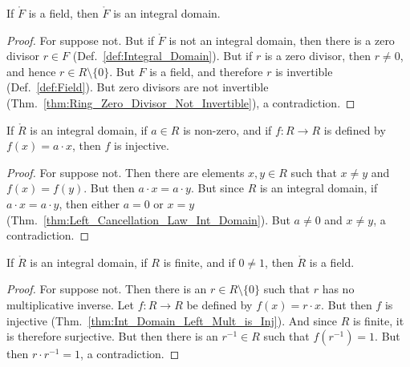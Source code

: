 \documentclass{article}                                                        %
\begin{document}
        \begin{theorem}
            \label{thm:Fields_are_Int_Domains}%
            If $\ring{F}$ is a field, then $\ring{F}$ is an integral domain.
        \end{theorem}
        \begin{proof}
            For suppose not. But if $\ring{F}$ is not an integral domain,
            then there is a zero divisor $r\in{F}$
            (Def.~\ref{def:Integral_Domain}). But if $r$ is a zero divisor, then
            $r\ne{0}$, and hence $r\in{R}\setminus\{0\}$. But $F$ is a field,
            and therefore $r$ is invertible (Def.~\ref{def:Field}). But
            zero divisors are not invertible
            (Thm.~\ref{thm:Ring_Zero_Divisor_Not_Invertible}), a contradiction.
        \end{proof}
        \begin{theorem}
            \label{thm:Int_Domain_Left_Mult_is_Inj}%
            If $\ring{R}$ is an integral domain, if $a\in{R}$ is non-zero, and
            if $f:R\rightarrow{R}$ is defined by $f(x)=a\cdot{x}$, then $f$
            is injective.
        \end{theorem}
        \begin{proof}
            For suppose not. Then there are elements $x,y\in{R}$ such that
            $x\ne{y}$ and $f(x)=f(y)$. But then $a\cdot{x}=a\cdot{y}$. But since
            $R$ is an integral domain, if $a\cdot{x}=a\cdot{y}$, then either
            $a=0$ or $x=y$ (Thm.~\ref{thm:Left_Cancellation_Law_Int_Domain}).
            But $a\ne{0}$ and $x\ne{y}$, a contradiction.
        \end{proof}
        \begin{theorem}
            \label{thm:Finite_Int_Domain_if_Field}%
            If $\ring{R}$ is an integral domain, if $R$ is finite, and if
            $0\ne{1}$, then $\ring{R}$ is a field.
        \end{theorem}
        \begin{proof}
            For suppose not. Then there is an $r\in{R}\setminus\{0\}$ such that
            $r$ has no multiplicative inverse. Let $f:R\rightarrow{R}$ be
            defined by $f(x)=r\cdot{x}$. But then $f$ is injective
            (Thm.~\ref{thm:Int_Domain_Left_Mult_is_Inj}). And since $R$ is
            finite, it is therefore surjective. But then there is an
            $r^{\minus{1}}\in{R}$ such that $f(r^{\minus{1}})=1$. But then
            $r\cdot{r}^{\minus{1}}=1$, a contradiction.
        \end{proof}
\end{document}
